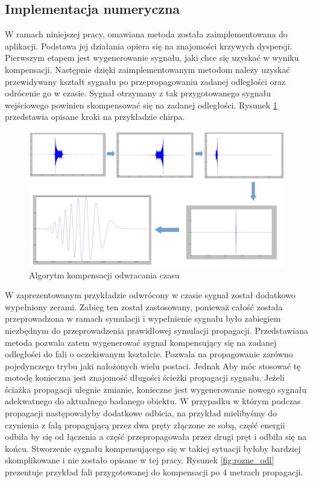 \subsection{Implementacja numeryczna}
W ramach niniejszej pracy, omawiana metoda została zaimplementowana do aplikacji. Podstawa jej działania opiera się na znajomości krzywych dyspersji. Pierwszym etapem jest wygenerowanie sygnału, jaki chce się uzyskać w wyniku kompensacji. Następnie dzięki zaimplementowanym metodom należy uzyskać przewidywany kształt sygnału po przepropagowaniu zadanej odległości oraz odrócenie go w czasie. Sygnał otrzymany z tak przygotowanego sygnału wejściowego powinien skompensować się na zadanej odległości. Rysunek \ref{fig:kolejne_etapy_TR} przedstawia opisane kroki na przykładzie chirpa.
\begin{figure}[h]
\centering
\includegraphics[width=14cm]{Zdjecia/4/algorytm_komp_tr}
\caption{Algorytm kompensacji odwracania czasu}
\label{fig:kolejne_etapy_TR}
\end{figure}

W zaprezentowanym przykładzie odwrócony w czasie sygnał został dodatkowo wypełniony zerami. Zabieg ten został zastosowany, ponieważ całość została przeprowadzona w ramach symulacji i wypełnienie sygnału było zabiegiem niezbędnym do przeprowadzenia prawidłowej symulacji propagacji. Przedstawiana metoda pozwala zatem wygenerować sygnał kompensujący się na zadanej odległości do fali o oczekiwanym kształcie. Pozwala na propagowanie zarówno pojedynczego trybu jaki nałożonych wielu postaci. Jednak Aby móc stosować tę motodę konieczna jest znajomość długości ścieżki propagacji sygnału. Jeżeli ściażka propagacji ulegnie zmianie, konieczne jest wygenerowanie nowego sygnału adekwatnego do aktualnego badanego obiektu. W przypadku w którym podczas propagacji następowałyby dodatkowe odbicia, na przykład mielibyśmy do czynienia z falą propagującą przez dwa pręty złączone ze sobą, część energii odbiła by się od łączenia a część przepropagowała przez drugi pręt i odbiła się na końcu. Stworzenie sygnału kompensującego się w takiej sytuacji byłoby bardziej skomplikowane i nie zostało opisane w tej pracy. Rysunek \ref{fig:rozne_odl} prezentuje przykład fali przygotowanej do kompensacji po 4 metrach propagacji. 

